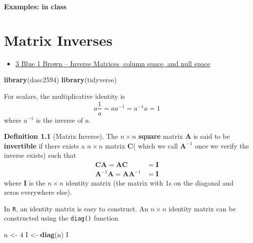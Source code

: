 \documentclass[
]{book}
\newenvironment{Shaded}{\begin{snugshade}}{\end{snugshade}}
\newcommand{\DecValTok}[1]{\textcolor[rgb]{0.00,0.00,0.81}{#1}}
\newcommand{\KeywordTok}[1]{\textcolor[rgb]{0.13,0.29,0.53}{\textbf{#1}}}
\newcommand{\NormalTok}[1]{#1}
\newcommand{\StringTok}[1]{\textcolor[rgb]{0.31,0.60,0.02}{#1}}
\providecommand{\tightlist}{%
  \setlength{\itemsep}{0pt}\setlength{\parskip}{0pt}}
\theoremstyle{definition}
\newtheorem{definition}{Definition}[chapter]
\theoremstyle{definition}
\theoremstyle{definition}
\theoremstyle{definition}
\theoremstyle{remark}
\begin{document}
\textbf{Examples: in class}

\hypertarget{matrix-inverse}{%
\chapter{Matrix Inverses}\label{matrix-inverse}}

\begin{itemize}
\tightlist
\item
  \href{https://www.3blue1brown.com/lessons/inverse-matrices}{3 Blue 1 Brown -- Inverse Matrices, column space, and null space}
\end{itemize}

\begin{Shaded}
\begin{Highlighting}[]
\KeywordTok{library}\NormalTok{(dasc2594)}
\KeywordTok{library}\NormalTok{(tidyverse)}
\end{Highlighting}
\end{Shaded}

For scalars, the multiplicative identity is
\[
a \frac{1}{a} = a a^{-1} = a^{-1} a = 1
\]
where \(a^{-1}\) is the inverse of \(a\).

\begin{definition}[Matrix Inverse]
\protect\hypertarget{def:matrix-inverse}{}\label{def:matrix-inverse}The \(n \times n\) \textbf{square} matrix \(\mathbf{A}\) is said to be \textbf{invertible} if there exists a \(n \times n\) matrix \(\mathbf{C}\)( which we call \(\mathbf{A}^{-1}\) once we verify the inverse exists) such that
\[
\begin{aligned}
\mathbf{C}\mathbf{A} = \mathbf{A} \mathbf{C} & = \mathbf{I} \\
\mathbf{A}^{-1} \mathbf{A} = \mathbf{A} \mathbf{A}^{-1} & = \mathbf{I}
\end{aligned}
\]
where \(\mathbf{I}\) is the \(n \times n\) identity matrix (the matrix with 1s on the diagonal and zeros everywhere else).
\end{definition}

In \texttt{R}, an identity matrix is easy to construct. An \(n \times n\) identity matrix can be constructed using the \texttt{diag()} function

\begin{Shaded}
\begin{Highlighting}[]
\NormalTok{n <-}\StringTok{ }\DecValTok{4}
\NormalTok{I <-}\StringTok{ }\KeywordTok{diag}\NormalTok{(n)}
\NormalTok{I}
\end{Highlighting}
\end{Shaded}
\end{document}
